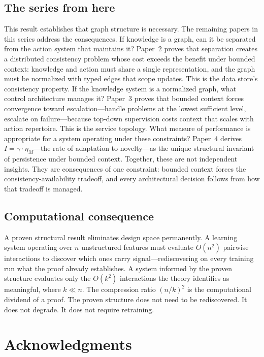 \documentclass[11pt]{article}
\theoremstyle{definition}
\begin{document}
\subsection*{The series from here}

This result establishes that graph structure is necessary.
The remaining papers in this series address the consequences.
If knowledge is a graph, can it be separated from the action system
that maintains it? Paper~2 \cite{McCarthy2026b} proves that
separation creates a distributed consistency problem whose cost
exceeds the benefit under bounded context: knowledge and action must
share a single representation, and the graph must be normalized with
typed edges that scope updates. This is the data store's consistency
property.
If the knowledge system is a normalized graph, what control
architecture manages it? Paper~3 \cite{McCarthy2026c} proves that
bounded context forces convergence toward escalation---handle
problems at the lowest sufficient level, escalate on failure---because
top-down supervision costs context that scales with action repertoire.
This is the service topology.
What measure of performance is appropriate for a system operating
under these constraints? Paper~4 \cite{McCarthy2026d} derives
$I = \gamma \cdot \eta_M$---the rate of adaptation to novelty---as
the unique structural invariant of persistence under bounded context.
Together, these are not independent insights. They are consequences
of one constraint: bounded context forces the
consistency-availability tradeoff, and every architectural decision
follows from how that tradeoff is managed.

\subsection*{Computational consequence}

A proven structural result eliminates design space permanently.
A learning system operating over $n$ unstructured features must
evaluate $O(n^2)$ pairwise interactions to discover which ones
carry signal---rediscovering on every training run what the proof
already establishes. A system informed by the proven structure
evaluates only the $O(k^2)$ interactions the theory identifies as
meaningful, where $k \ll n$. The compression ratio $(n/k)^2$ is
the computational dividend of a proof. The proven structure does not
need to be rediscovered. It does not degrade. It does not require
retraining.

\section*{Acknowledgments}
\end{document}
